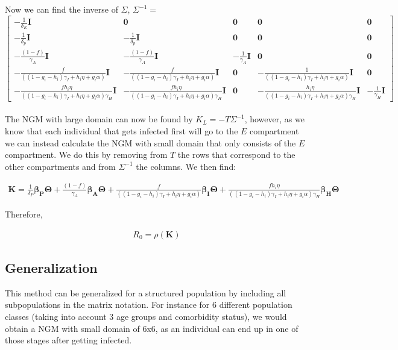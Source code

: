\documentclass{article}
\begin{document}
Now we can find the inverse of $\Sigma$, $\Sigma^{-1} = $
\\
\noindent
\[
  \begin{bmatrix}  
   - \frac{1}{\delta_E} \boldsymbol{I} & \boldsymbol{0} & \boldsymbol{0} & \boldsymbol{0} & \boldsymbol{0} \\
   -\frac{1}{\delta_p} \boldsymbol{I} & -\frac{1}{\delta_p} \boldsymbol{I} & \boldsymbol{0} & \boldsymbol{0} & \boldsymbol{0} \\
   -\frac{(1-f)}{\gamma_A} \boldsymbol{I} & -\frac{(1-f)}{\gamma_A} \boldsymbol{I} & -\frac{1}{\gamma_A} \boldsymbol{I} & \boldsymbol{0} & \boldsymbol{0} \\
   -\frac{f}{((1-g_i-h_i) \gamma_{I} + h_i \eta + g_i \alpha)} \boldsymbol{I} & -\frac{f}{((1-g_i-h_i) \gamma_{I} + h_i \eta + g_i \alpha)} \boldsymbol{I} & \boldsymbol{0} & -\frac{1}{((1-g_i-h_i) \gamma_{I} + h_i \eta + g_i \alpha)} \boldsymbol{I} & \boldsymbol{0} \\
   -\frac{fh_i \eta}{((1-g_i-h_i) \gamma_{I} + h_i \eta + g_i \alpha)\gamma_H} \boldsymbol{I} & -\frac{fh_i \eta}{((1-g_i-h_i) \gamma_{I} + h_i \eta + g_i \alpha)\gamma_H} \boldsymbol{I} & \boldsymbol{0} & -\frac{h_i \eta}{((1-g_i-h_i) \gamma_{I} + h_i \eta + g_i \alpha)\gamma_H} \boldsymbol{I} & -\frac{1}{\gamma_H} \boldsymbol{I} 
   \end{bmatrix}
\]
\\
The NGM with large domain can now be found by $K_L = - T \Sigma^{-1}$, however, as we know that each individual that gets infected first will go to the $E$ compartment we can instead calculate the NGM with small domain that only consists of the $E$ compartment.
We do this by removing from $T$ the rows that correspond to the other compartments and from $\Sigma^{-1}$ the columns. 
We then find: 

\begin{gather*}
\boldsymbol{K} = \frac{1}{\delta_P} \boldsymbol{\beta_P} \boldsymbol{\Theta} + \frac{(1-f)}{\gamma_A} \boldsymbol{\beta_A} \boldsymbol{\Theta} + \frac{f}{((1-g_i-h_i) \gamma_{I} + h_i \eta + g_i \alpha)} \boldsymbol{\beta_I} \boldsymbol{\Theta} + \frac{fh_i \eta}{((1-g_i-h_i) \gamma_{I} + h_i \eta + g_i \alpha)\gamma_H} \boldsymbol{\beta_H} \boldsymbol{\Theta}
\end{gather*}

Therefore, 

\begin{gather}
R_0 = \rho(\boldsymbol{K})
\end{gather}

\subsection*{Generalization}

This method can be generalized for a structured population by including all subpopulations in the matrix notation. For instance for 6 different population classes (taking into account 3 age groups and comorbidity status), we would obtain a NGM with small domain of 6x6, as an individual can end up in one of those stages after getting infected. 
\end{document}
